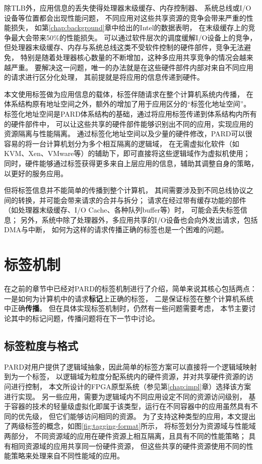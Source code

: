 除TLB外，应用信息的丢失使得处理器末级缓存、内存控制器、
系统总线或I/O设备等位置都会出现性能问题，
不同应用对这些共享资源的竞争会带来严重的性能损失，
如第\ref{chap:background}章中给出的Intel的数据表明，
在末级缓存上的竞争最大会带来50\%的性能损失\cite{}。
可以通过软件层次的调度缓解I/O设备上的竞争，
但处理器末级缓存、内存与系统总线这类不受软件控制的硬件部件，竞争无法避免，
特别是随着处理器核心数量的不断增加，这种多应用共享竞争的情况会越来越严重。
要解决这一问题，唯一的办法就是在这些硬件部件内部对来自不同应用的请求进行区分化处理，
其前提就是将应用的信息传递到硬件。

本文使用标签做为应用信息的载体，标签伴随请求在整个计算机系统内传播，
在体系结构原有地址空间之外，额外的增加了用于应用区分的``标签化地址空间''。
标签化地址空间是PARD体系结构的基础，通过将应用标签传递到体系结构内所有的硬件部件中，
可以让这些共享的硬件部件能够识别出不同的应用，实现应用的资源隔离与性能隔离。
通过标签化地址空间以及少量的硬件修改，PARD可以很容易的将一台计算机划分为多个相互隔离的逻辑域，
在无需虚拟化软件（如KVM、Xen、VMware等）的辅助下，即可直接将这些逻辑域作为虚拟机使用；
同时，硬件能够通过标签获得更多来自上层应用的信息，辅助其调整自身的策略，以更好的服务应用。

但将标签信息并不能简单的传播到整个计算机，
其间需要涉及到不同总线协议之间的转换，并可能会带来请求的合并与拆分；
请求在经过带有缓存功能的部件（如处理器末级缓存、I/O Cache、各种队列buffer等）时，
可能会丢失标签信息；
另外，系统中除了处理器外，多应用共享的I/O设备也会向外发出请求，包括DMA与中断，
如何为这样的请求传播正确的标签也是一个困难的问题。


\section{标签机制}

在之前的章节中已经对PARD的标签机制进行了介绍，简单来说其核心包括两点：
一是如何为计算机中的请求\textbf{标记}上正确的标签，
二是保证标签在整个计算机系统中正确\textbf{传播}。
但在具体实现标签机制时，仍然有一些问题需要考虑，
本节主要讨论其中的标记问题，传播问题将在下一节中讨论。


\subsection{标签粒度与格式}

PARD对用户提供了逻辑域抽象，因此简单的标签方案可以直接将一个逻辑域映射到为一个标签，
以逻辑域为粒度分配系统内的硬件资源，并对共享硬件资源的访问进行控制，
本文所设计的FPGA原型系统（参见第\ref{chap:impl}章）选择该方案进行实现。
另一些应用，需要为逻辑域内不同应用设定不同的资源访问级别，
基于容器的技术的轻量级虚拟化即属于该类型，运行在不同容器中的应用虽然具有不同的优先级，
但它们能够访问相同的资源。
为了支持这种类型的应用，本文提出了两级标签的概念，如图\ref{fig:tagging-format}所示，
将标签划分为资源域与性能域两部分，
不同资源域的应用在硬件资源上相互隔离，且具有不同的性能策略；
具有相同资源域的应用共享同一份硬件资源，
但这些共享的硬件资源使用不同的性能策略来处理来自不同性能域的应用。

